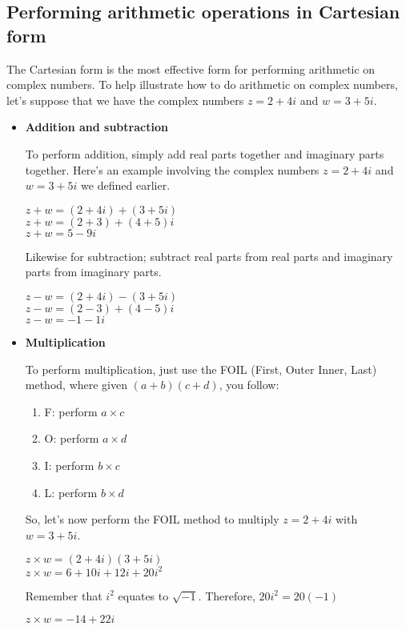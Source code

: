 \documentclass{article}
\begin{document}
\subsection{Performing arithmetic operations     in Cartesian form}
The Cartesian form  is the most effective form for performing arithmetic on complex numbers. To help illustrate how to do arithmetic on complex numbers, let's suppose that we have the complex numbers $z=2+4i$ and $w=3+5i$.

\begin{itemize}
    \item \textbf{Addition and subtraction}
    
    To perform addition, simply add real parts together and imaginary parts together. Here's an example involving the complex numbers $z=2+4i$ and $w=3+5i$ we defined earlier.
    
    $z + w = (2+4i) + (3+5i)$ \\
    $z + w = (2+3) + (4+5)i$ \\
    $z + w = 5-9i $

    Likewise for subtraction; subtract real parts from real parts and imaginary parts from imaginary parts.

    $z - w = (2+4i) - (3+5i)$ \\
    $z - w = (2-3) + (4-5)i$ \\
    $z - w = -1 -1i$

    \item \textbf{Multiplication}
    
    To perform multiplication, just use the FOIL (First, Outer Inner, Last) method, where given $(a+b)(c+d)$, you follow:
    
    \begin{enumerate}
        \item F: perform $a\times c$
        \item O: perform $a\times d$
        \item I: perform $b\times c$
        \item L: perform $b\times d$
    \end{enumerate}
    So, let's now perform the FOIL method to multiply $z=2+4i$ with $w=3+5i$.

    $z \times w = (2+4i)(3+5i)$ \\
    $z \times w = 6+10i+12i+20i^2$

    Remember that $i^2$ equates to $\sqrt{-1}$. Therefore, $20i^2=20(-1)$
    
    $z \times w = -14 + 22i$


\end{itemize}
\end{document}
